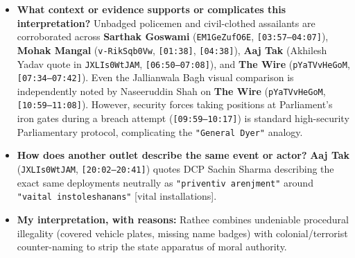 \documentclass[10pt,a4paper]{article}
\begin{document}
\begin{itemize}[leftmargin=1.5em, itemsep=3pt, topsep=4pt]
  \item \textbf{What context or evidence supports or complicates this interpretation?} Unbadged policemen and civil-clothed assailants are corroborated across \textbf{Sarthak Goswami} (\texttt{EM1GeZufO6E}, \texttt{[03:57--04:07]}), \textbf{Mohak Mangal} (\texttt{v-RikSqb0Vw}, \texttt{[01:38]}, \texttt{[04:38]}), \textbf{Aaj Tak} (Akhilesh Yadav quote in \texttt{JXLIs0WtJAM}, \texttt{[06:50--07:08]}), and \textbf{The Wire} (\texttt{pYaTVvHeGoM}, \texttt{[07:34--07:42]}). Even the Jallianwala Bagh visual comparison is independently noted by Naseeruddin Shah on \textbf{The Wire} (\texttt{pYaTVvHeGoM}, \texttt{[10:59--11:08]}). However, security forces taking positions at Parliament's iron gates during a breach attempt (\texttt{[09:59--10:17]}) is standard high-security Parliamentary protocol, complicating the \texttt{"General Dyer"} analogy.
  \item \textbf{How does another outlet describe the same event or actor?} \textbf{Aaj Tak} (\texttt{JXLIs0WtJAM}, \texttt{[20:02--20:41]}) quotes DCP Sachin Sharma describing the exact same deployments neutrally as \texttt{"priventiv arenjment"} around \texttt{"vaital instoleshanans"} [vital installations].
  \item \textbf{My interpretation, with reasons:} Rathee combines undeniable procedural illegality (covered vehicle plates, missing name badges) with colonial/terrorist counter-naming to strip the state apparatus of moral authority.
\end{itemize}
\end{document}
